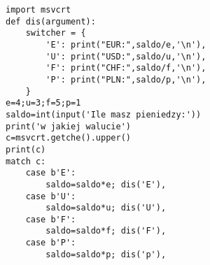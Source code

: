\begin{verbatim}
import msvcrt
def dis(argument):
    switcher = {
        'E': print("EUR:",saldo/e,'\n'),
        'U': print("USD:",saldo/u,'\n'),
        'F': print("CHF:",saldo/f,'\n'),
        'P': print("PLN:",saldo/p,'\n'),
    }
e=4;u=3;f=5;p=1
saldo=int(input('Ile masz pieniedzy:'))
print('w jakiej walucie')
c=msvcrt.getche().upper()
print(c)
match c:
    case b'E': 
        saldo=saldo*e; dis('E'),
    case b'U':
        saldo=saldo*u; dis('U'),
    case b'F':
        saldo=saldo*f; dis('F'),
    case b'P':
        saldo=saldo*p; dis('p'),
\end{verbatim}